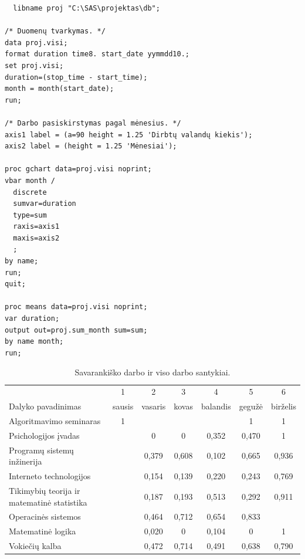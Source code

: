 \begin{listing}[H]
  \begin{verbatim}
  libname proj "C:\SAS\projektas\db";

/* Duomenų tvarkymas. */
data proj.visi;
format duration time8. start_date yymmdd10.;
set proj.visi;
duration=(stop_time - start_time);
month = month(start_date);
run;

/* Darbo pasiskirstymas pagal mėnesius. */
axis1 label = (a=90 height = 1.25 'Dirbtų valandų kiekis');
axis2 label = (height = 1.25 'Mėnesiai');

proc gchart data=proj.visi noprint;
vbar month /
  discrete
  sumvar=duration
  type=sum
  raxis=axis1
  maxis=axis2
  ;
by name;
run;
quit;

proc means data=proj.visi noprint;
var duration;
output out=proj.sum_month sum=sum;
by name month;
run;
  \end{verbatim}
  \caption{SAS programa naudota pasiskirstymų analizei.}
  \label{lst:months}
\end{listing}

\begin{table}
  \centering
  \begin{tabular}{|l|c|c|c|c|c|c|}
\hline
&1&2&3&4&5&6\\
Dalyko pavadinimas&sausis&vasaris&kovas&balandis&gegužė&birželis\\
\hline
Algoritmavimo seminaras&1&&&&1&1\\
Psichologijos įvadas&&0&0&0,352&0,470&1\\
Programų sistemų inžinerija&&0,379&0,608&0,102&0,665&0,936\\
Interneto technologijos&&0,154&0,139&0,220&0,243&0,769\\
Tikimybių teorija ir matematinė statistika&&0,187&0,193&0,513&0,292&0,911\\
Operacinės sistemos&&0,464&0,712&0,654&0,833&\\
Matematinė logika&&0,020&0&0,104&0&1\\
Vokiečių kalba&&0,472&0,714&0,491&0,638&0,790\\
\hline
  \end{tabular}
  \caption{Savarankiško darbo ir viso darbo santykiai.}
  \label{tab:months_part}
\end{table}

